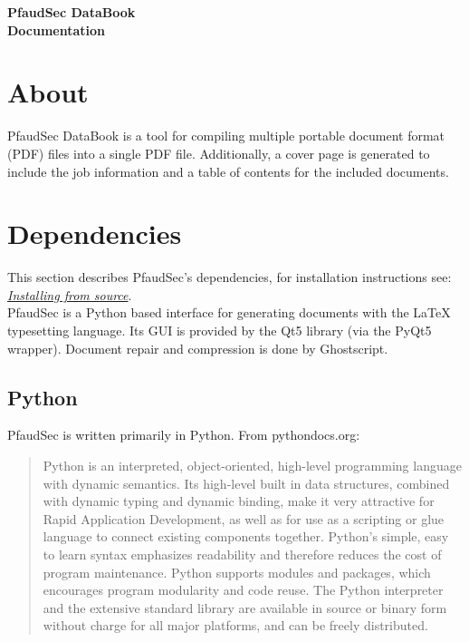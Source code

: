 \documentclass[14pt]{article}
\begin{document}
\setlength\headheight{20pt}
\begin{flushleft}

\fontsize{35}{35}\selectfont\textbf{PfaudSec DataBook\\ Documentation}\\

\normalsize

\setcounter{tocdepth}{2}
\setcounter{secnumdepth}{3}
\startcontents[section]
\begin{center}
\setlength{\parskip}{0.5em}
\setlength{\parskip}{1em}
\end{center}

\newenvironment{subs}
  {\adjustwidth{2em}{0pt}}
  {\endadjustwidth}



\section{About}

PfaudSec DataBook is a tool for compiling multiple portable document format (PDF) files into a single PDF file.
Additionally, a cover page is generated to include the job information and a table of contents for the included documents.

\section{Dependencies}

This section describes PfaudSec's dependencies, for installation instructions see:
\hyperref[sec:install]{\textit{Installing from source}}.\\[\normalbaselineskip]
PfaudSec is a Python based interface for generating documents with the \LaTeX\xspace typesetting language.
Its GUI is provided by the Qt5 library (via the PyQt5 wrapper).
Document repair and compression is done by Ghostscript.

	\subsection{Python}
PfaudSec is written primarily in Python.
From pythondocs.org:

\begin{quote}
Python is an interpreted, object-oriented, high-level programming language with dynamic semantics. Its high-level built in data structures, combined with dynamic typing and dynamic binding, make it very attractive for Rapid Application Development, as well as for use as a scripting or glue language to connect existing components together. Python's simple, easy to learn syntax emphasizes readability and therefore reduces the cost of program maintenance. Python supports modules and packages, which encourages program modularity and code reuse. The Python interpreter and the extensive standard library are available in source or binary form without charge for all major platforms, and can be freely distributed.\end{quote}


\end{flushleft}
\end{document}
